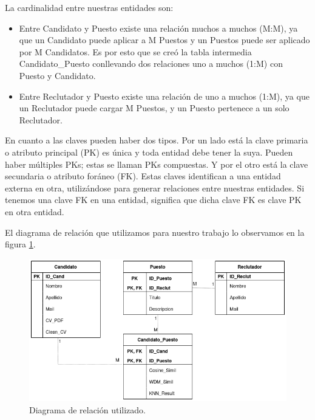 \documentclass[12pt,a4paper]{article}
\begin{document}
La cardinalidad entre nuestras entidades son:
\begin{itemize}
\item Entre Candidato y Puesto existe una relación muchos a muchos (M:M), ya que un Candidato puede aplicar a M Puestos y un Puestos puede ser aplicado por M Candidatos. Es por esto que se creó la tabla intermedia Candidato\_Puesto conllevando dos relaciones uno a muchos (1:M) con Puesto y Candidato.
\item Entre Reclutador y Puesto existe una relación de uno a muchos (1:M), ya que un Reclutador puede cargar M Puestos, y un Puesto pertenece a un solo Reclutador.
\end{itemize}

En cuanto a las claves pueden haber dos tipos. Por un lado está la clave primaria o atributo principal (PK)  es única y toda entidad debe tener la suya. Pueden haber múltiples PKs; estas se llaman PKs compuestas. Y por el otro está la clave secundaria o atributo foráneo (FK). Estas claves identifican a una entidad externa en otra, utilizándose para generar relaciones entre nuestras entidades. Si tenemos una clave FK en una entidad, significa que dicha clave FK es clave PK en otra entidad.


El diagrama de relación que utilizamos para nuestro trabajo lo observamos en la figura \ref{fig:Entity_Relation}.

\begin{figure}[H]    %
  \centering
  \includegraphics[width=1\textwidth]{images/BD_Entity_Relation.png}
  \caption{Diagrama de relación utilizado.}  
  \label{fig:Entity_Relation}
\end{figure}
\end{document}
